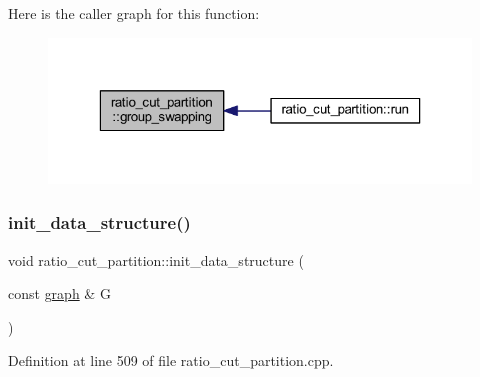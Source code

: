 Here is the caller graph for this function\+:\nopagebreak
\begin{figure}[H]
\begin{center}
\leavevmode
\includegraphics[width=323pt]{classratio__cut__partition_ae257dadc6cea5aef11badb68eadba0a5_icgraph}
\end{center}
\end{figure}
\mbox{\label{classratio__cut__partition_a53b8ad2845ed39cc2677721c747bdce6}} 
\subsubsection{\texorpdfstring{init\+\_\+data\+\_\+structure()}{init\_data\_structure()}}
{\footnotesize\ttfamily void ratio\+\_\+cut\+\_\+partition\+::init\+\_\+data\+\_\+structure (\begin{DoxyParamCaption}\item[{const \mbox{\hyperlink{classgraph}{graph}} \&}]{G }\end{DoxyParamCaption})\hspace{0.3cm}{\ttfamily [protected]}}



Definition at line 509 of file ratio\+\_\+cut\+\_\+partition.\+cpp.


